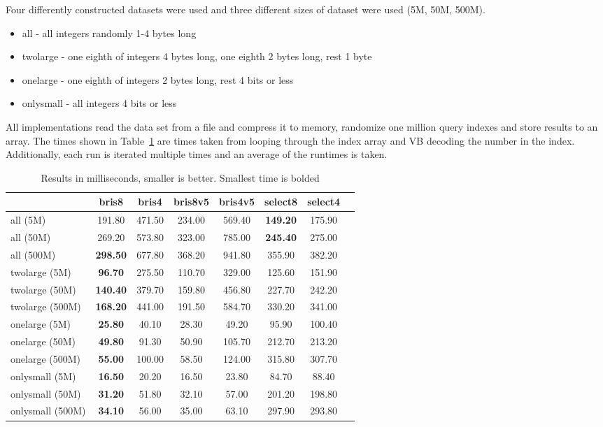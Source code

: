 \pagebreak
Four differently constructed datasets were used and three different sizes of dataset were used (5M, 50M, 500M). 

\begin{itemize}
  \item all - all integers randomly 1-4 bytes long
  \item twolarge - one eighth of integers 4 bytes long, one eighth 2 bytes long, rest 1 byte    
  \item onelarge - one eighth of integers 2 bytes long, rest 4 bits or less
  \item onlysmall - all integers 4 bits or less
\end{itemize}

All implementations read the data set from a file and compress it to memory, randomize one million query indexes and store results to an array. The times shown in Table~\ref{table:results1} 
are times taken from looping through the index array and VB decoding the number in the index. Additionally, each run is iterated multiple times and an average of the runtimes is taken. 

\begin{table}
\centering
\caption{Results in milliseconds, smaller is better. Smallest time is bolded
\label{table:results1}}
\begin{tabular}{l||c c c c c c c} 
& bris8 & bris4 & bris8v5 & bris4v5 & select8 & select4  \\
 \hline \hline 
all (5M)   & 191.80 & 471.50 & 234.00 & 569.40 & \textbf{149.20} & 175.90 \\
all (50M)   & 269.20 & 573.80 & 323.00 & 785.00 & \textbf{245.40} & 275.00 \\
all (500M)   & \textbf{298.50} & 677.80 & 368.20 & 941.80 & 355.90 & 382.20 \\
twolarge (5M)   & \textbf{96.70} & 275.50 & 110.70 & 329.00 & 125.60 & 151.90 \\
twolarge (50M)   & \textbf{140.40} & 379.70 & 159.80 & 456.80 & 227.70 & 242.20 \\
twolarge (500M)   & \textbf{168.20} & 441.00 & 191.50 & 584.70 & 330.20 & 341.00 \\
onelarge (5M)   & \textbf{25.80} & 40.10 & 28.30 & 49.20 & 95.90 & 100.40 \\
onelarge (50M)   & \textbf{49.80} & 91.30 & 50.90 & 105.70 & 212.70 & 213.20 \\
onelarge (500M)   & \textbf{55.00} & 100.00 & 58.50 & 124.00 & 315.80 & 307.70 \\
onlysmall (5M)   & \textbf{16.50} & 20.20 & 16.50 & 23.80 & 84.70 & 88.40 \\
onlysmall (50M)   & \textbf{31.20} & 51.80 & 32.10 & 57.00 & 201.20 & 198.80 \\
onlysmall (500M)   & \textbf{34.10}  & 56.00 & 35.00 & 63.10 & 297.90 & 293.80 \\

\hline
\end{tabular}
\end{table}

